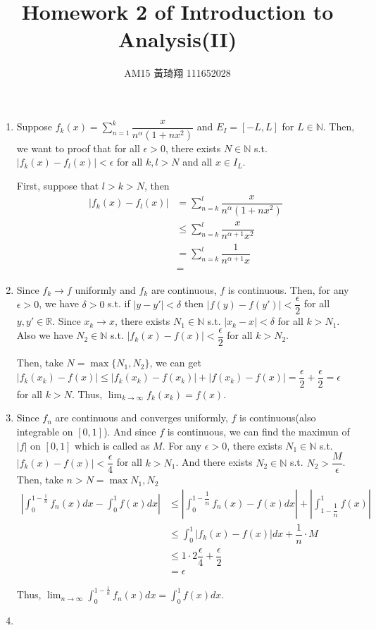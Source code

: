 \documentclass[12pt]{article}
\title{Homework 2 of Introduction to Analysis(II)}
\author{AM15 黃琦翔 111652028}
\begin{document}
\maketitle
\begin{enumerate}
    \item Suppose $f_k(x) = \displaystyle\sum_{n=1}^{k} \dfrac{x}{n^\alpha (1+nx^2)}$ and $E_I = [-L, L]$ for $L \in \mathbb{N}$.
    Then, we want to proof that 
    for all $\epsilon > 0$, there exists $N \in \mathbb{N}$ s.t. 
    $|f_k(x) - f_l(x)| < \epsilon$ for all $k, l > N$ and all $x \in I_L$.

    First, suppose that $l > k > N$, then \begin{align*}
        |f_k(x) - f_l(x)| &= \sum_{n=k}^l \dfrac{x}{n^\alpha (1+nx^2)}\\
        &\leq \displaystyle\sum_{n=k}^{l} \dfrac{x}{n^{\alpha+1} x^2}\\
        &= \displaystyle\sum_{n=k}^l \dfrac{1}{n^{\alpha+1} x}\\
        &= 
    \end{align*}


    \item Since $f_k \to f$ uniformly and $f_k$ are continuous, $f$ is continuous.
    Then, for any $\epsilon > 0$, we have $\delta > 0 $ s.t. if $|y - y'| < \delta$ then $|f(y) - f(y')| < \dfrac{\epsilon}{2}$ for all $y, y' \in \mathbb{R}$.
    Since $x_k \to x$, there exists $N_1 \in \mathbb{N}$ s.t. $|x_k - x| < \delta$ for all $k > N_1$.
    Also we have $N_2 \in \mathbb{N}$ s.t. $|f_k(x) - f(x)| < \dfrac{\epsilon}{2}$ for all $k > N_2$.

    Then, take $N  = \max\{ N_1, N_2\}$, we can get $|f_k(x_k) - f(x)| \leq |f_k(x_k) - f(x_k)| + |f(x_k) - f(x)| = \dfrac{\epsilon}{2} + \dfrac{\epsilon}{2} = \epsilon$ for all $k > N$.
    Thus, $\displaystyle\lim_{k\to\infty} f_k(x_k) = f(x)$.

    \item Since $f_n$ are continuous and converges uniformly, $f$ is continuous(also integrable on $[0, 1]$).
    And since $f$ is continuous, we can find the maximun of $|f|$ on $[0, 1]$ which is called as $M$.
    For any $\epsilon > 0$, there exists $N_1 \in \mathbb{N}$ s.t. $|f_k(x) - f(x)| < \dfrac{\epsilon}{4}$ for all $k > N_1$.
    And there exists $N_2 \in \mathbb{N}$ s.t. $N_2 > \dfrac{M}{\epsilon}$.
    Then, take $n > N = \max{N_1, N_2}$ \begin{align*}
        \left|\int_0^{1-\frac{1}{n}} f_n(x) dx - \int_0^1 f(x) dx\right| &\leq \left|\int_{0}^{1-\dfrac{1}{n}} f_n(x) - f(x) dx\right| + \left|\int_{1-\dfrac{1}{n}}^{1} f(x)\right|\\
        &\leq \int_0^1 |f_k(x) - f(x)| dx + \dfrac{1}{n} \cdot M\\
        &\leq 1 \cdot 2\dfrac{\epsilon}{4} + \dfrac{\epsilon}{2}\\
        &= \epsilon
    \end{align*}

    Thus, $\displaystyle\lim_{n\to\infty} \displaystyle\int_{0}^{1-\frac{1}{n}} f_n(x) dx = \displaystyle\int_0^1 f(x) dx$.

    \item 
\end{enumerate}
\end{document}
